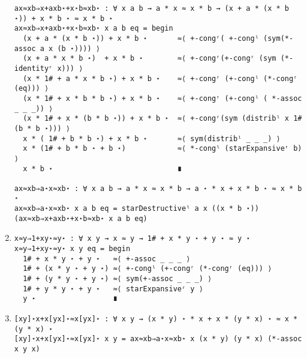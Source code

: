 \begin{enumerate}
\begin{verbatim}
ax≈xb⇒x+axb⋆+x⋆b≈xb⋆ : ∀ x a b → a * x ≈ x * b → (x + a * (x * b ⋆)) + x * b ⋆ ≈ x * b ⋆
ax≈xb⇒x+axb⋆+x⋆b≈xb⋆ x a b eq = begin
  (x + a * (x * b ⋆)) + x * b ⋆       ≈⟨ +-congʳ( +-congˡ (sym(*-assoc a x (b ⋆)))) ⟩
  (x + a * x * b ⋆)  + x * b ⋆        ≈⟨ +-congʳ(+-congʳ (sym (*-identityʳ x))) ⟩
  (x * 1# + a * x * b ⋆) + x * b ⋆    ≈⟨ +-congʳ (+-congˡ (*-congʳ (eq))) ⟩
  (x * 1# + x * b * b ⋆) + x * b ⋆    ≈⟨ +-congʳ (+-congˡ ( *-assoc _ _ _)) ⟩
  (x * 1# + x * (b * b ⋆)) + x * b ⋆  ≈⟨ +-congʳ(sym (distribˡ x 1# (b * b ⋆))) ⟩ 
  x * ( 1# + b * b ⋆) + x * b ⋆       ≈⟨ sym(distribˡ _ _ _) ⟩ 
  x * (1# + b * b ⋆ + b ⋆)            ≈⟨ *-congˡ (starExpansiveʳ b) ⟩ 
  x * b ⋆                             ∎ 

ax≈xb⇒a⋆x≈xb⋆ : ∀ x a b → a * x ≈ x * b → a ⋆ * x + x * b ⋆ ≈ x * b ⋆
ax≈xb⇒a⋆x≈xb⋆ x a b eq = starDestructiveˡ a x ((x * b ⋆)) (ax≈xb⇒x+axb⋆+x⋆b≈xb⋆ x a b eq)
\end{verbatim}
\item
\begin{verbatim}
x≈y⇒1+xy⋆≈y⋆ : ∀ x y → x ≈ y → 1# + x * y ⋆ + y ⋆ ≈ y ⋆
x≈y⇒1+xy⋆≈y⋆ x y eq = begin
  1# + x * y ⋆ + y ⋆   ≈⟨ +-assoc _ _ _ ⟩
  1# + (x * y ⋆ + y ⋆) ≈⟨ +-congˡ (+-congʳ (*-congʳ (eq))) ⟩
  1# + (y * y ⋆ + y ⋆) ≈⟨ sym(+-assoc _ _ _) ⟩ 
  1# + y * y ⋆ + y ⋆   ≈⟨ starExpansiveʳ y ⟩ 
  y ⋆                  ∎
\end{verbatim}
\item
\begin{verbatim}
[xy]⋆x+x[yx]⋆≈x[yx]⋆ : ∀ x y → (x * y) ⋆ * x + x * (y * x) ⋆ ≈ x * (y * x) ⋆
[xy]⋆x+x[yx]⋆≈x[yx]⋆ x y = ax≈xb⇒a⋆x≈xb⋆ x (x * y) (y * x) (*-assoc x y x)
\end{verbatim}
\end{enumerate}
